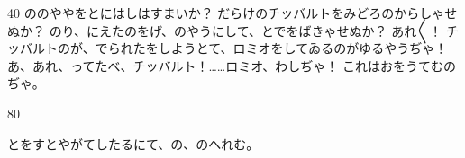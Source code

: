 \documentclass[tate,paper=b6j,jafontsize=9pt]{jlreq}
\begin{document}
\begin{azconvIndented}{4\zw}{0\zw}
ののややをとにはしはすまいか？ だらけのチッバルトをみどろのからしゃせぬか？ のり、にえたのをげ、のやうにして、とでをばきゃせぬか？ あれ{〳〵}！ チッバルトのが、でられたをしようとて、ロミオをしてゐるのがゆるやうぢゃ！ あ、あれ、ってたべ、チッバルト！……ロミオ、わしぢゃ！ これはおをうてむのぢゃ。

\end{azconvIndented}
\begin{azconvIndented}{8\zw}{0\zw}

とをすとやがてしたるにて、の、のへれむ。

\end{azconvIndented}

\end{document}
